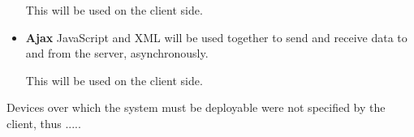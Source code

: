 \begin{flushleft}
\begin{itemize}
	This will be used on the client side.

	\item\textbf{Ajax}
	\newline
	JavaScript and XML will be used together to send and receive data to and from the server, asynchronously.
	\newline

	This will be used on the client side.
\end{itemize}

Devices over which the system must be deployable were not specified by the client, thus .....

\end{flushleft}






